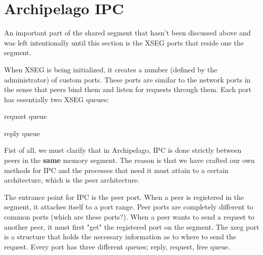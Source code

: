 \begin{comment}
\subsection{Peers}\label{sec:arch-peer}

Peers are Archipelago components that are responsible for accepting, processing 
and sending of the I/O requests. They are essential for the modular nature of 
Archipelago since each of them can be considered as a separate entity. They do 
their own logging, signal handling and processing.

The main Archipelago peers can be seen in Figure ?. As we can see from this 
figure, peers are processes that are attached to an XSEG segment. In the 
previous chaptr, we have mentioned that XSEG segments facilitate the IPC between 
different Archipelago components by offering a shared space where process can 
read and write to very fast. This however barely scratches the surface of IPC in 
Archipelago. In the following section, we will discuss more in-length the 
details behind Archipelago IPC

\end{comment}

\section{Archipelago IPC}\label{sec:arch-ipc}

An important part of the shared segment that hasn't been discussed above and 
was left intentionally until this section is the XSEG ports that reside one the 
segment.

When XSEG is being initialized, it creates a number (defined by the 
administrator) of custom ports. These ports are similar to the network ports in 
the sense that peers bind them and listen for requests through them. Each port 
has essentially two XSEG queues:
\begin{inparaenum}[i)]
\item request queue
\item reply queue
\end{inparaenum}


Fist of all, we must clarify that in Archipelago, IPC is done strictly between 
peers in the \textbf{same} memory segment. The reason is that we have crafted 
our own methods for IPC and the processes that need it must attain to a certain 
architecture, which is the peer architecture.

The entrance point for IPC is the peer port. When a peer is registered in the 
segment, it attaches itself to a port range. Peer ports are completely different 
to common ports (which are these ports?). When a peer wants to send a request to 
another peer, it must first "get" the registered port on the segment. The xseg 
port is a structure that holds the necessary information as to where to send the 
request. Every port has three different queues; reply, request, free queue.

